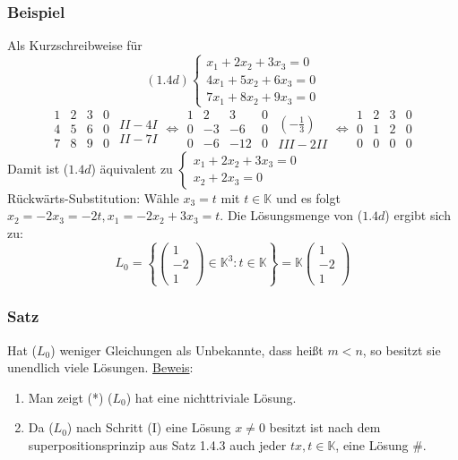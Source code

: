 \subsubsection{Beispiel}
Als Kurzschreibweise für \[(1.4d)\begin{cases}x_1+2x_2+3x_3=0\\ 4x_1+5x_2+6x_3=0\\ 7x_1+8x_2+9x_3=0\end{cases}\]
\[\begin{array}{ccc|c}1 & 2 & 3 & 0\\ 4 & 5 & 6 & 0\\ 7 & 8 & 9 & 0\end{array} \begin{array}{c} \\ II - 4I\\ II-7I\end{array} \Leftrightarrow \begin{array}{ccc|c}1 & 2 & 3 & 0\\ 0 & -3 & -6 & 0\\ 0 & -6 & -12 & 0\end{array} \begin{array}{c} \\ (-\frac{1}{3})\\ III-2II\end{array} \Leftrightarrow \begin{array}{ccc|c}1 & 2 & 3 & 0\\ 0 & 1 & 2 & 0\\ 0 & 0 & 0 & 0\end{array}\]
Damit ist ($1.4d$) äquivalent zu $\begin{cases}x_1+2x_2+3x_3=0\\ x_2+2x_3=0\end{cases}$\\
Rückwärts-Substitution: Wähle $x_3=t$ mit $t\in\mathbb{K}$ und es folgt $x_2=-2x_3=-2t,x_1=-2x_2+3x_3=t$.  Die Lösungsmenge von ($1.4d$) ergibt sich zu:
\[ L_0=\left\{\left(\begin{array}{c}1\\ -2\\ 1\end{array}\right) \in \mathbb{K}^3:t\in\mathbb{K}\right\} = \mathbb{K}\left(\begin{array}{c}1\\ -2\\ 1\end{array}\right)\]
\subsubsection{Satz}
Hat ($L_0$) weniger Gleichungen als Unbekannte, dass heißt $m<n$, so besitzt sie unendlich viele Lösungen.
\underline{Beweis}:
\renewcommand{\labelenumi}{\Roman{enumi}.}
\begin{enumerate}
\item Man zeigt (*) ($L_0$) hat eine nichttriviale Lösung.
\item Da ($L_0$) nach Schritt (I) eine Lösung $x\not= 0$ besitzt ist nach dem superpositionsprinzip aus Satz 1.4.3 auch jeder $tx,t\in \mathbb{K}$, eine Lösung \#.
\end{enumerate}
